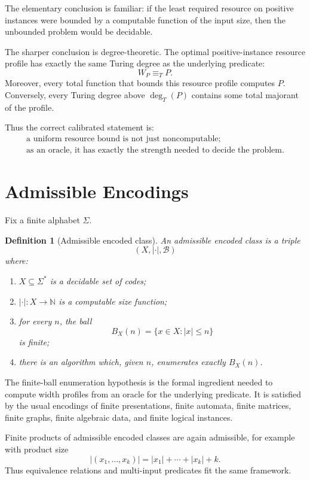 \documentclass[11pt]{article}
\newtheorem{definition}[theorem]{Definition}
\begin{document}
The elementary conclusion is familiar: if the least required resource on positive instances were bounded by a computable function of the input size, then the unbounded problem would be decidable.

The sharper conclusion is degree-theoretic. The optimal positive-instance resource profile has exactly the same Turing degree as the underlying predicate:
\[
W_P\equiv_T P.
\]
Moreover, every total function that bounds this resource profile computes \(P\). Conversely, every Turing degree above \(\deg_T(P)\) contains some total majorant of the profile.

Thus the correct calibrated statement is:
\[
\begin{gathered}
\text{a uniform resource bound is not just noncomputable;}\\
\text{as an oracle, it has exactly the strength needed to decide the problem.}
\end{gathered}
\]

\section{Admissible Encodings}

Fix a finite alphabet \(\Sigma\).

\begin{definition}[Admissible encoded class]
An admissible encoded class is a triple
\[
(X,|\cdot|,\mathcal B)
\]
where:
\begin{enumerate}[label=(\roman*)]
\item \(X\subseteq\Sigma^\ast\) is a decidable set of codes;
\item \(|\cdot|:X\to\mathbb N\) is a computable size function;
\item for every \(n\), the ball
\[
B_X(n)=\{x\in X:|x|\le n\}
\]
is finite;
\item there is an algorithm which, given \(n\), enumerates exactly \(B_X(n)\).
\end{enumerate}
\end{definition}

The finite-ball enumeration hypothesis is the formal ingredient needed to compute width profiles from an oracle for the underlying predicate. It is satisfied by the usual encodings of finite presentations, finite automata, finite matrices, finite graphs, finite algebraic data, and finite logical instances.

Finite products of admissible encoded classes are again admissible, for example with product size
\[
|(x_1,\ldots,x_k)|=|x_1|+\cdots+|x_k|+k.
\]
Thus equivalence relations and multi-input predicates fit the same framework.
\end{document}
